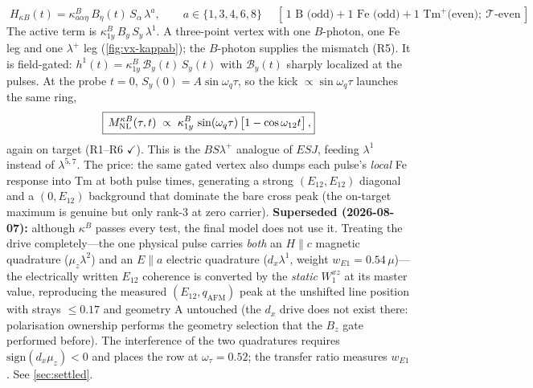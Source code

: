 \documentclass[11pt,a4paper]{article}
\begin{document}
\begin{equation}
  \boxed{\;H_{\kappa B}(t)=\kappa^B_{a\alpha\eta}\,B_\eta(t)\,S_\alpha\,\lambda^a,\qquad a\in\{1,3,4,6,8\}\;}
  \quad[\,\text{1 B (odd)}+\text{1 Fe (odd)}+\text{1 Tm}^+\text{(even)};\ \mathcal T\text{-even}\,]
\end{equation}
The active term is $\kappa^B_{1y}\,B_y\,S_y\,\lambda^1$.  A three-point vertex
with one $B$-photon, one Fe leg and one $\lambda^+$ leg (\cref{fig:vx-kappab});
the $B$-photon supplies the mismatch (R5).  It is field-gated:
$h^1(t)=\kappa^B_{1y}\,\mathcal B_y(t)\,S_y(t)$ with $\mathcal B_y(t)$ sharply
localized at the pulses.  At the probe $t=0$, $S_y(0)=A\sin\omega_q\tau$, so the
kick $\propto\sin\omega_q\tau$ launches the same ring,
\begin{equation}
  \boxed{\,M_{\rm NL}^{\kappa B}(\tau,t)\;\propto\;\kappa^B_{1y}\,\sin(\omega_q\tau)\,
  \big[1-\cos\omega_{12}t\big]\,,}
\end{equation}
again on target (R1--R6 $\checkmark$).  This is the $BS\lambda^+$ analogue of
$ESJ$, feeding $\lambda^1$ instead of $\lambda^{5,7}$.  The price: the same gated
vertex also dumps each pulse's \emph{local} Fe response into Tm at both pulse
times, generating a strong $(E_{12},E_{12})$ diagonal and a $(0,E_{12})$
background that dominate the bare cross peak (the on-target maximum is genuine
but only rank-3 at zero carrier).  \textbf{Superseded (2026-08-07):} although
$\kappa^B$ passes every test, the final model does not use it.  Treating the
drive completely---the one physical pulse carries \emph{both} an
$H\!\parallel\!c$ magnetic quadrature ($\mu_z\lambda^2$) and an
$E\!\parallel\!a$ electric quadrature ($d_x\lambda^1$, weight
$w_{E1}=0.54\,\mu$)---the electrically written $E_{12}$ coherence is converted
by the \emph{static} $W^{xz}_1$ at its master value, reproducing the measured
$(E_{12},q_{\mathrm{AFM}})$ peak at the unshifted line position with strays
$\leq0.17$ and geometry A untouched (the $d_x$ drive does not exist there:
polarisation ownership performs the geometry selection that the $B_z$ gate
performed before).  The interference of the two quadratures requires
$\mathrm{sign}(d_x\mu_z)<0$ and places the row at $\omega_\tau=0.52$; the
transfer ratio measures $w_{E1}$.  See \cref{sec:settled}.
\end{document}
